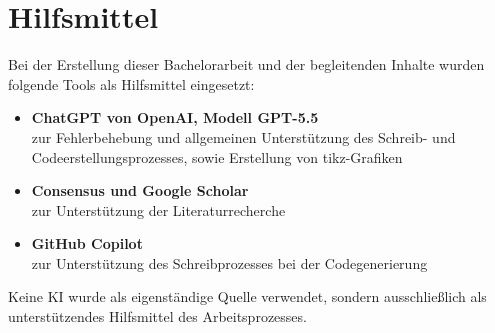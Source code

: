 \chapter*{Hilfsmittel}
Bei der Erstellung dieser Bachelorarbeit und der begleitenden Inhalte wurden folgende Tools als Hilfsmittel eingesetzt:
\begin{itemize}
    \item \textbf{ChatGPT von OpenAI, Modell GPT-5.5}\\
    zur Fehlerbehebung und allgemeinen Unterstützung des Schreib- und Codeerstellungsprozesses, sowie Erstellung von tikz-Grafiken
    \item \textbf{Consensus und Google Scholar}\\
    zur Unterstützung der Literaturrecherche
    \item \textbf{GitHub Copilot}\\
    zur Unterstützung des Schreibprozesses bei der Codegenerierung
\end{itemize}

Keine KI wurde als eigenständige Quelle verwendet, sondern ausschließlich als unterstützendes Hilfsmittel des Arbeitsprozesses.
